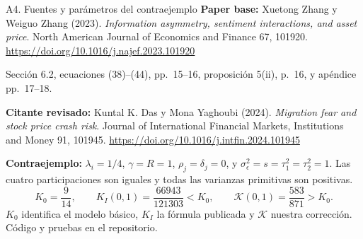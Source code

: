 \documentclass[aspectratio=169,11pt]{beamer}
\begin{document}
\begin{frame}{A4. Fuentes y parámetros del contraejemplo}
 \small
 \textbf{Paper base:} Xuetong Zhang y Weiguo Zhang (2023).
 \emph{Information asymmetry, sentiment interactions, and asset price}.
 North American Journal of Economics and Finance 67, 101920.
 \url{https://doi.org/10.1016/j.najef.2023.101920}
 \medskip\par
 Sección 6.2, ecuaciones (38)--(44), pp.~15--16,
 proposición 5(ii), p.~16, y apéndice pp.~17--18.
 \medskip\par
 \textbf{Citante revisado:} Kuntal K. Das y Mona Yaghoubi (2024).
 \emph{Migration fear and stock price crash risk}.
 Journal of International Financial Markets, Institutions and Money 91, 101945.
 \url{https://doi.org/10.1016/j.intfin.2024.101945}
 \medskip\par
 \textbf{Contraejemplo:} \(\lambda_i=1/4\), \(\gamma=R=1\),
 \(\rho_j=\delta_j=0\), y
 \(\sigma_\epsilon^2=s=\tau_1^2=\tau_2^2=1\).
 Las cuatro participaciones son iguales y todas las varianzas primitivas
 son positivas.
 \[
  K_0=\frac9{14},\qquad
  K_I(0{,}1)=\frac{66943}{121303}<K_0,\qquad
  \mathcal K(0{,}1)=\frac{583}{871}>K_0.
 \]
 \(K_0\) identifica el modelo básico, \(K_I\) la fórmula publicada
 y \(\mathcal K\) nuestra corrección. Código y pruebas en el repositorio.
\end{frame}
\end{document}
